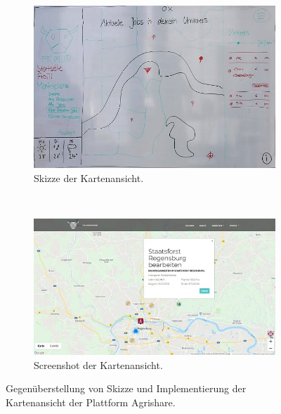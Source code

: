 \begin{figure}
    \centering
    \begin{subfigure}[b]{0.45\textwidth}
        \includegraphics[width=\textwidth]{99_IMG/03_Umsetzung/mapWireframe_3.jpg}
        \caption{Skizze der Kartenansicht.}
        \label{fig:mapWireframe}
    \end{subfigure}
    ~ %
    \begin{subfigure}[b]{0.45\textwidth}
        \includegraphics[width=\textwidth]{99_IMG/03_Umsetzung/mapScreenshot.jpg}
        \caption{Screenshot der Kartenansicht.}
        \label{fig:mapScreenshot}
    \end{subfigure}
    \caption{Gegenüberstellung von Skizze und Implementierung der Kartenansicht der Plattform Agrishare.}\label{fig:mapView}
\end{figure}


